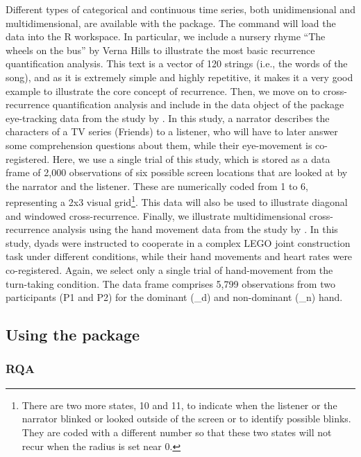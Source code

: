 Different types of categorical and continuous time series, both unidimensional and multidimensional, are available with the package. The command  will load the data into the R workspace. In particular, we include a nursery rhyme ``The wheels on the bus'' by Verna Hills to illustrate the most basic recurrence quantification analysis. This text is a vector of 120 strings (i.e., the words of the song), and as it is extremely simple and highly repetitive, it makes it a very good example to illustrate the core concept of recurrence. Then, we move on to cross-recurrence quantification analysis and include in the data object of the package eye-tracking data from the study by \cite{richardson2005looking}. In this study, a narrator describes the characters of a TV series (Friends) to a listener, who will have to later answer some comprehension questions about them, while their eye-movement is co-registered. Here, we use a single trial of this study, which is stored as a data frame of 2,000 observations of six possible screen locations that are looked at by the narrator and the listener. These are numerically coded from 1 to 6, representing a 2x3 visual grid\footnote{There are two more states, 10 and 11, to indicate when the listener or the narrator blinked or looked outside of the screen or to identify possible blinks. They are coded with a different number so that these two states will not recur when the radius is set near 0.}. This data will also be used to illustrate diagonal and windowed cross-recurrence. Finally, we illustrate multidimensional cross-recurrence analysis using the hand movement data from the study by \cite{wallot2016beyond}. In this study, dyads were instructed to cooperate in a complex LEGO joint construction task under different conditions, while their hand movements and heart rates were co-registered. Again, we select only a single trial of hand-movement from the turn-taking condition. The data frame comprises 5,799 observations from two participants (P1 and P2) for the dominant (\_d) and non-dominant (\_n) hand. 

\subsection[Using the crqa package]{Using the  package}

\subsubsection{RQA}
\label{sec:rqa:data}

